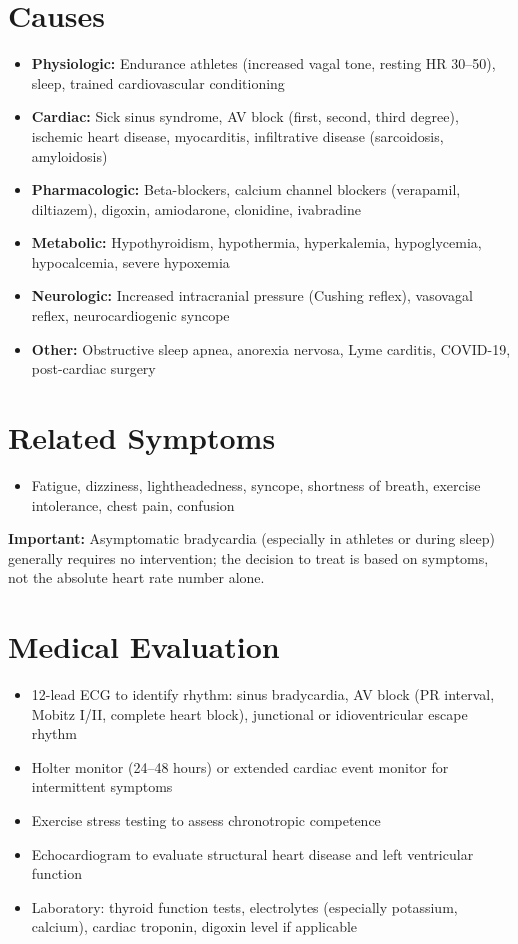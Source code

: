\section*{Causes}
\begin{itemize}
 \item \textbf{Physiologic:} Endurance athletes (increased vagal tone, resting HR 30--50), sleep, trained cardiovascular conditioning
 \item \textbf{Cardiac:} Sick sinus syndrome, AV block (first, second, third degree), ischemic heart disease, myocarditis, infiltrative disease (sarcoidosis, amyloidosis)
 \item \textbf{Pharmacologic:} Beta-blockers, calcium channel blockers (verapamil, diltiazem), digoxin, amiodarone, clonidine, ivabradine
 \item \textbf{Metabolic:} Hypothyroidism, hypothermia, hyperkalemia, hypoglycemia, hypocalcemia, severe hypoxemia
 \item \textbf{Neurologic:} Increased intracranial pressure (Cushing reflex), vasovagal reflex, neurocardiogenic syncope
 \item \textbf{Other:} Obstructive sleep apnea, anorexia nervosa, Lyme carditis, COVID-19, post-cardiac surgery
\end{itemize}

\section*{Related Symptoms}
\begin{itemize}
 \item Fatigue, dizziness, lightheadedness, syncope, shortness of breath, exercise intolerance, chest pain, confusion
\end{itemize}
\textbf{Important:} Asymptomatic bradycardia (especially in athletes or during sleep) generally requires no intervention; the decision to treat is based on symptoms, not the absolute heart rate number alone.

\section*{Medical Evaluation}
\begin{itemize}
 \item 12-lead ECG to identify rhythm: sinus bradycardia, AV block (PR interval, Mobitz I/II, complete heart block), junctional or idioventricular escape rhythm
 \item Holter monitor (24--48 hours) or extended cardiac event monitor for intermittent symptoms
 \item Exercise stress testing to assess chronotropic competence
 \item Echocardiogram to evaluate structural heart disease and left ventricular function
 \item Laboratory: thyroid function tests, electrolytes (especially potassium, calcium), cardiac troponin, digoxin level if applicable
\end{itemize}

